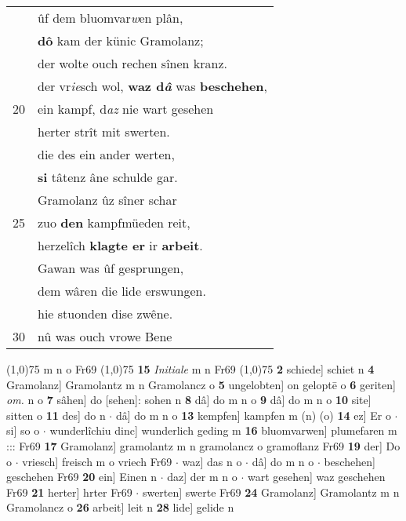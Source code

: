 \documentclass[8pt,a4paper,notitlepage]{article}
\begin{document}
\begin{table}[ht]
\begin{minipage}[t]{0.5\linewidth}
\begin{tabular}{rl}
 & ûf dem bluomvar\textit{w}en plân,\\ 
 & \textbf{dô} kam der künic Gramolanz;\\ 
 & der wolte ouch rechen sînen kranz.\\ 
 & der vr\textit{ie}sch wol, \textbf{waz d\textit{â}} was \textbf{beschehen},\\ 
20 & ein kampf, d\textit{az} nie wart gesehen\\ 
 & herter strît mit swerten.\\ 
 & die des ein ander werten,\\ 
 & \textbf{si} tâtenz âne schulde gar.\\ 
 & Gramolanz ûz sîner schar\\ 
25 & zuo \textbf{den} kampfmüeden reit,\\ 
 & herzelîch \textbf{klagte er} ir \textbf{arbeit}.\\ 
 & Gawan was ûf gesprungen,\\ 
 & dem wâren die lide erswungen.\\ 
 & hie stuonden dise zwêne.\\ 
30 & nû was ouch vrowe Bene\\ 
\end{tabular}
\scriptsize
\line(1,0){75} \newline
m n o Fr69 \newline
\line(1,0){75} \newline
\textbf{15} \textit{Initiale} m n Fr69  \newline
\line(1,0){75} \newline
\textbf{2} schiede] schiet n \textbf{4} Gramolanz] Gramolantz m n Gramolancz o \textbf{5} ungelobten] on geloptē o \textbf{6} geriten] \textit{om.} n o \textbf{7} sâhen] do [sehen]: sohen n \textbf{8} dâ] do m n o \textbf{9} dâ] do m n o \textbf{10} site] sitten o \textbf{11} des] do n  $\cdot$ dâ] do m n o \textbf{13} kempfen] kampfen m (n) (o) \textbf{14} ez] Er o  $\cdot$ si] so o  $\cdot$ wunderlîchiu dinc] wunderlich geding m \textbf{16} bluomvarwen] plumefaren m ::: Fr69 \textbf{17} Gramolanz] gramolantz m n gramolancz o gramoflanz Fr69 \textbf{19} der] Do o  $\cdot$ vriesch] freisch m o vriech Fr69  $\cdot$ waz] das n o  $\cdot$ dâ] do m n o  $\cdot$ beschehen] geschehen Fr69 \textbf{20} ein] Einen n  $\cdot$ daz] der m n o  $\cdot$ wart gesehen] waz geschehen Fr69 \textbf{21} herter] hrter Fr69  $\cdot$ swerten] swerte Fr69 \textbf{24} Gramolanz] Gramolantz m n Gramolancz o \textbf{26} arbeit] leit n \textbf{28} lide] gelide n \newline
\end{minipage}
\end{table}
\end{document}
